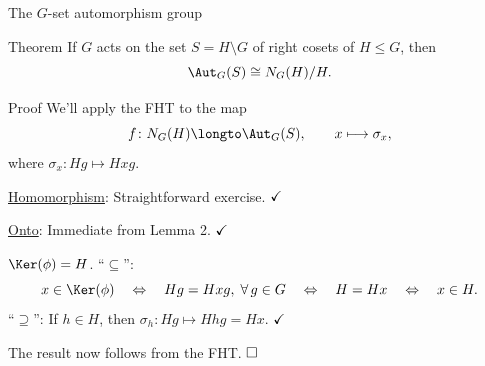 \documentclass[8pt, handout]{beamer}
\begin{document}
\begin{frame}{The $G$-set automorphism group}
  
  \begin{block}{Theorem}
    If $G$ acts on the set $S=H\!\setminus\!G$ of right cosets of
    $H\leq G$, then
    \[
    \Aut_G(S)\cong N_G(H)/H.
    \]
  \end{block}

  \begin{exampleblock}{Proof}
    We'll apply the FHT to the map
    \[
    f\colon N_G(H)\longto \Aut_G(S), \qquad x\longmapsto \sigma_x,
    \]
    where $\sigma_x\colon Hg\longmapsto Hxg$. \medskip

    \underline{Homomorphism}: Straightforward exercise. $\hfill\checkmark$
    \medskip

    \underline{Onto}: Immediate from
    Lemma 2. $\hfill\checkmark$ \medskip
    
    \underline{$\Ker(\phi)=H$}. ``$\subseteq$'': 
    \[
    x\in\Ker(\phi)
    \quad\Leftrightarrow\quad
    Hg=Hxg,\; \text{$\forall\,g\in G$}\quad\Leftrightarrow\quad
    H=Hx\quad\Leftrightarrow\quad x\in H.
    \]
    ``$\supseteq$'': If $h\in H$, then $\sigma_h\colon Hg\mapsto
    Hhg=Hx$. $\hfill\checkmark$ \medskip
    
    The result now follows from the FHT. $\hfill\Box$
  \end{exampleblock}
  
\end{frame}

\end{document}
